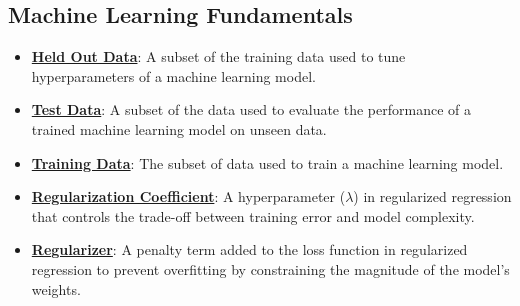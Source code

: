 \documentclass{article}%
\begin{document}
\subsection{Machine Learning Fundamentals}%
\label{subsec:MachineLearningFundamentals}%
\begin{itemize}[leftmargin=*]%
\item \href{https://purdue.brightspace.com/d2l/common/assets/pdfjs-d2l-dist/1.0.14-legacy/web/viewer.html?file=\%2Fcontent\%2Fenforced\%2F1095467-wl.202510.CS.24300.001\%2F10L1-CrossValidation.pdf\%3Fou\%3D1095467\&lang=en-us\&container=d2l-fileviewer-rendered-pdf\&fullscreen=d2l-fileviewer-rendered-pdf-dialog\&height=667#page=6}{\textbf{Held Out Data}}: A subset of the training data used to tune hyperparameters of a machine learning model.%
\item \href{https://purdue.brightspace.com/d2l/common/assets/pdfjs-d2l-dist/1.0.14-legacy/web/viewer.html?file=\%2Fcontent\%2Fenforced\%2F1095467-wl.202510.CS.24300.001\%2F10L1-CrossValidation.pdf\%3Fou\%3D1095467\&lang=en-us\&container=d2l-fileviewer-rendered-pdf\&fullscreen=d2l-fileviewer-rendered-pdf-dialog\&height=667#page=6}{\textbf{Test Data}}: A subset of the data used to evaluate the performance of a trained machine learning model on unseen data.%
\item \href{https://purdue.brightspace.com/d2l/common/assets/pdfjs-d2l-dist/1.0.14-legacy/web/viewer.html?file=\%2Fcontent\%2Fenforced\%2F1095467-wl.202510.CS.24300.001\%2F10L1-CrossValidation.pdf\%3Fou\%3D1095467\&lang=en-us\&container=d2l-fileviewer-rendered-pdf\&fullscreen=d2l-fileviewer-rendered-pdf-dialog\&height=667#page=6}{\textbf{Training Data}}: The subset of data used to train a machine learning model.%
\item \href{https://purdue.brightspace.com/d2l/common/assets/pdfjs-d2l-dist/1.0.14-legacy/web/viewer.html?file=\%2Fcontent\%2Fenforced\%2F1095467-wl.202510.CS.24300.001\%2F10L1-CrossValidation.pdf\%3Fou\%3D1095467\&lang=en-us\&container=d2l-fileviewer-rendered-pdf\&fullscreen=d2l-fileviewer-rendered-pdf-dialog\&height=667#page=17}{\textbf{Regularization Coefficient}}: A hyperparameter ($\lambda$) in regularized regression that controls the trade-off between training error and model complexity.%
\item \href{https://purdue.brightspace.com/d2l/common/assets/pdfjs-d2l-dist/1.0.14-legacy/web/viewer.html?file=\%2Fcontent\%2Fenforced\%2F1095467-wl.202510.CS.24300.001\%2F10L1-CrossValidation.pdf\%3Fou\%3D1095467\&lang=en-us\&container=d2l-fileviewer-rendered-pdf\&fullscreen=d2l-fileviewer-rendered-pdf-dialog\&height=667#page=17}{\textbf{Regularizer}}: A penalty term added to the loss function in regularized regression to prevent overfitting by constraining the magnitude of the model's weights.%

\end{itemize}
\end{document}
